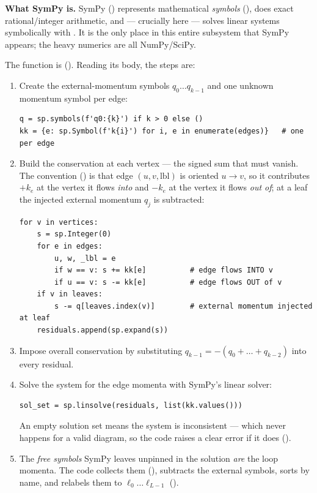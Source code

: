 \begin{note}
\textbf{What SymPy is.} SymPy () represents mathematical
\emph{symbols} (), does exact rational/integer arithmetic, and
--- crucially here --- solves linear systems symbolically with
. It is the only place in this entire subsystem that SymPy
appears; the heavy numerics are all NumPy/SciPy.
\end{note}

The function is  (). Reading
its body, the steps are:

\begin{enumerate}
  \item Create the external-momentum symbols $q_0\dots q_{k-1}$ and one unknown
        momentum symbol per edge:
        \begin{lstlisting}
q = sp.symbols(f'q0:{k}') if k > 0 else ()
kk = {e: sp.Symbol(f'k{i}') for i, e in enumerate(edges)}   # one per edge
        \end{lstlisting}
  \item Build the conservation  at each vertex --- the signed sum
        that must vanish. The convention () is
        that edge $(u,v,\text{lbl})$ is oriented $u\to v$, so it contributes
        $+k_e$ at the vertex it flows \emph{into} and $-k_e$ at the vertex it
        flows \emph{out of}; at a leaf the injected external momentum $q_j$ is
        subtracted:
        \begin{lstlisting}
for v in vertices:
    s = sp.Integer(0)
    for e in edges:
        u, w, _lbl = e
        if w == v: s += kk[e]          # edge flows INTO v
        if u == v: s -= kk[e]          # edge flows OUT of v
    if v in leaves:
        s -= q[leaves.index(v)]        # external momentum injected at leaf
    residuals.append(sp.expand(s))
        \end{lstlisting}
  \item Impose overall conservation by substituting
        $q_{k-1} = -(q_0+\dots+q_{k-2})$ into every residual.
  \item Solve the system for the edge momenta with SymPy's linear solver:
        \begin{lstlisting}
sol_set = sp.linsolve(residuals, list(kk.values()))
        \end{lstlisting}
        An empty solution set means the system is inconsistent --- which never
        happens for a valid \msrjd{} diagram, so the code raises a clear error if
        it does ().
  \item The \emph{free symbols} SymPy leaves unpinned in the solution \emph{are}
        the loop momenta. The code collects them
        (), subtracts the external symbols, sorts by
        name, and relabels them to $\ell_0\dots\ell_{L-1}$
        ().
\end{enumerate}

